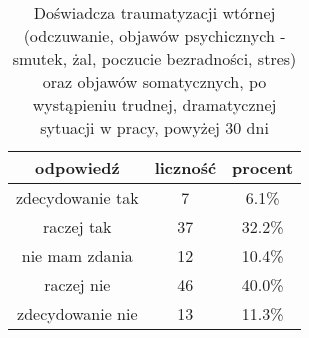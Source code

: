 \begin{table}[H]
\caption{Doświadcza traumatyzacji wtórnej (odczuwanie, objawów psychicznych - smutek, żal, poczucie bezradności, stres) oraz objawów somatycznych, po wystąpieniu trudnej, dramatycznej sytuacji w pracy, powyżej 30 dni}
\centering
\begin{tabular}{ | c | c | c |}
\hline
odpowiedź & liczność & procent\\
\hline
zdecydowanie tak  &  7  & 6.1\% \\
\hline
raczej tak  &  37  & 32.2\% \\
\hline
nie mam zdania  &  12  & 10.4\% \\
\hline
raczej nie  &  46  & 40.0\% \\
\hline
zdecydowanie nie  &  13  & 11.3\% \\
\hline
\end{tabular}
\label{tab:Q11}
\end{table}